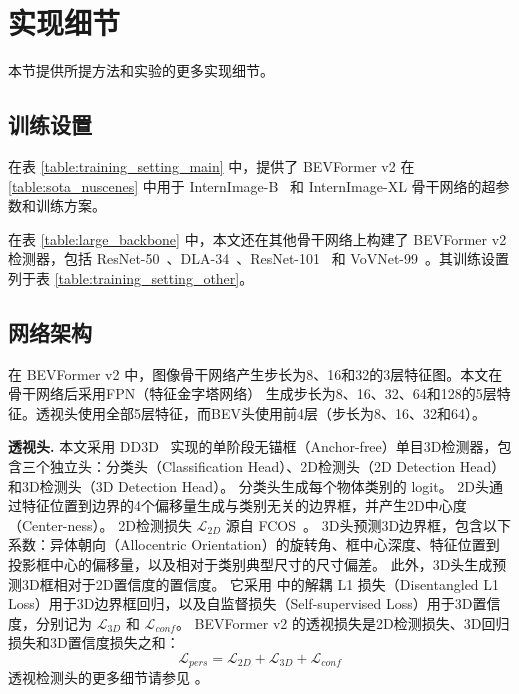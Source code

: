 \clearpage
\section{实现细节}
本节提供所提方法和实验的更多实现细节。

\subsection{训练设置}
在表 \ref{table:training_setting_main} 中，提供了 BEVFormer v2 在 \cref{table:sota_nuscenes} 中用于 InternImage-B~\cite{InternImage} 和 InternImage-XL 骨干网络的超参数和训练方案。



在表 \ref{table:large_backbone} 中，本文还在其他骨干网络上构建了 BEVFormer v2 检测器，包括 ResNet-50~\cite{ResNet}、DLA-34~\cite{DLA}、ResNet-101~\cite{ResNet} 和 VoVNet-99~\cite{Vovnet}。其训练设置列于表 \ref{table:training_setting_other}。



\subsection{网络架构}
在 BEVFormer v2 中，图像骨干网络产生步长为8、16和32的3层特征图。本文在骨干网络后采用FPN（特征金字塔网络）\cite{FPN} 生成步长为8、16、32、64和128的5层特征。透视头使用全部5层特征，而BEV头使用前4层（步长为8、16、32和64）。

\noindent\textbf{透视头.} 本文采用 DD3D~\cite{DD3D} 实现的单阶段无锚框（Anchor-free）单目3D检测器，包含三个独立头：分类头（Classification Head）、2D检测头（2D Detection Head）和3D检测头（3D Detection Head）。
分类头生成每个物体类别的 logit。
2D头通过特征位置到边界的4个偏移量生成与类别无关的边界框，并产生2D中心度（Center-ness）。
2D检测损失 $\mathcal{L}_{2D}$ 源自 FCOS~\cite{fcos}。
3D头预测3D边界框，包含以下系数：异体朝向（Allocentric Orientation）的旋转角、框中心深度、特征位置到投影框中心的偏移量，以及相对于类别典型尺寸的尺寸偏差。
此外，3D头生成预测3D框相对于2D置信度的置信度。
它采用 \cite{MonoDIS} 中的解耦 L1 损失（Disentangled L1 Loss）用于3D边界框回归，以及自监督损失（Self-supervised Loss）用于3D置信度，分别记为 $\mathcal{L}_{3D}$ 和 $\mathcal{L}_{conf}$。
BEVFormer v2 的透视损失是2D检测损失、3D回归损失和3D置信度损失之和：
\begin{equation}
    \mathcal{L}_{pers} = \mathcal{L}_{2D} + \mathcal{L}_{3D} + \mathcal{L}_{conf}
\end{equation}
透视检测头的更多细节请参见 \cite{DD3D}。

